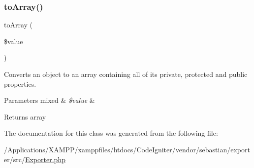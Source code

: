\subsubsection{\texorpdfstring{to\+Array()}{toArray()}}
{\footnotesize\ttfamily to\+Array (\begin{DoxyParamCaption}\item[{}]{\$value }\end{DoxyParamCaption})}

Converts an object to an array containing all of its private, protected and public properties.


\begin{DoxyParams}[1]{Parameters}
mixed & {\em \$value} & \\
\hline
\end{DoxyParams}
\begin{DoxyReturn}{Returns}
array 
\end{DoxyReturn}


The documentation for this class was generated from the following file\+:\begin{DoxyCompactItemize}
\item 
/\+Applications/\+X\+A\+M\+P\+P/xamppfiles/htdocs/\+Code\+Igniter/vendor/sebastian/exporter/src/\mbox{\hyperlink{_exporter_8php}{Exporter.\+php}}\end{DoxyCompactItemize}
